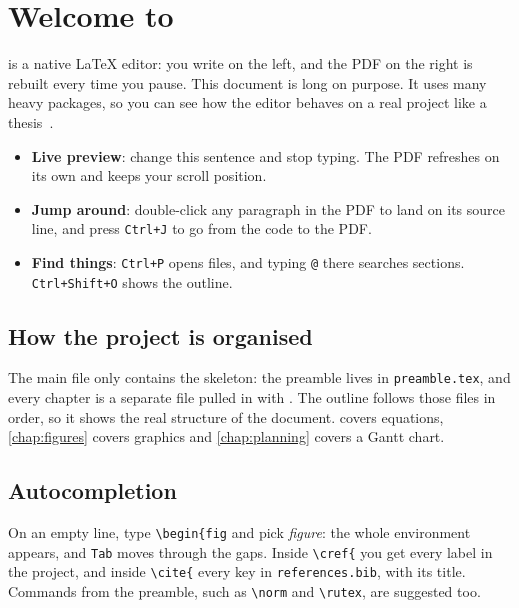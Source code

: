 \chapter{Welcome to \rutex}
\label{chap:introduction}

\rutex{} is a native \LaTeX{} editor: you write on the left, and the PDF on the
right is rebuilt every time you pause. This document is long on purpose. It
uses many heavy packages, so you can see how the editor behaves on a real
project like a thesis~\cite{knuth1984,lamport1994}.

\begin{tryit}
  \begin{itemize}
    \item \textbf{Live preview}: change this sentence and stop typing. The PDF
          refreshes on its own and keeps your scroll position.
    \item \textbf{Jump around}: double-click any paragraph in the PDF to land on
          its source line, and press \texttt{Ctrl+J} to go from the code to the PDF.
    \item \textbf{Find things}: \texttt{Ctrl+P} opens files, and typing \texttt{@}
          there searches sections. \texttt{Ctrl+Shift+O} shows the outline.
  \end{itemize}
\end{tryit}

\section{How the project is organised}
\label{sec:organisation}

The main file only contains the skeleton: the preamble lives in
\texttt{preamble.tex}, and every chapter is a separate file pulled in with
\verb||. The outline follows those files in order, so it shows the real
structure of the document.  covers equations,
\cref{chap:figures} covers graphics and \cref{chap:planning} covers a Gantt chart.

\section{Autocompletion}

\begin{tryit}
  On an empty line, type \verb|\begin{fig| and pick \emph{figure}: the whole
  environment appears, and \texttt{Tab} moves through the gaps. Inside
  \verb|\cref{| you get every label in the project, and inside \verb|\cite{|
  every key in \texttt{references.bib}, with its title. Commands from the
  preamble, such as \verb|\norm| and \verb|\rutex|, are suggested too.
\end{tryit}

